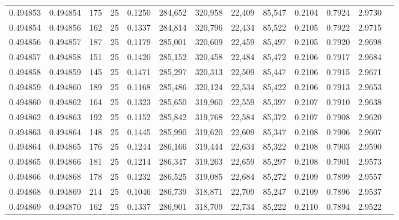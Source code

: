 \begin{tabular}{rrrrrrrrrrrrr}
0.494853 & 0.494854 &   175 &  25 &                                     0.1250 & 284,652 & 320,958 &  22,409 &  85,547 & 0.2104 & 0.7924 & 2.9730 \\
0.494854 & 0.494856 &   162 &  25 &                                     0.1337 & 284,814 & 320,796 &  22,434 &  85,522 & 0.2105 & 0.7922 & 2.9715 \\
0.494856 & 0.494857 &   187 &  25 &                                     0.1179 & 285,001 & 320,609 &  22,459 &  85,497 & 0.2105 & 0.7920 & 2.9698 \\
0.494857 & 0.494858 &   151 &  25 &                                     0.1420 & 285,152 & 320,458 &  22,484 &  85,472 & 0.2106 & 0.7917 & 2.9684 \\
0.494858 & 0.494859 &   145 &  25 &                                     0.1471 & 285,297 & 320,313 &  22,509 &  85,447 & 0.2106 & 0.7915 & 2.9671 \\
0.494859 & 0.494860 &   189 &  25 &                                     0.1168 & 285,486 & 320,124 &  22,534 &  85,422 & 0.2106 & 0.7913 & 2.9653 \\
0.494860 & 0.494862 &   164 &  25 &                                     0.1323 & 285,650 & 319,960 &  22,559 &  85,397 & 0.2107 & 0.7910 & 2.9638 \\
0.494862 & 0.494863 &   192 &  25 &                                     0.1152 & 285,842 & 319,768 &  22,584 &  85,372 & 0.2107 & 0.7908 & 2.9620 \\
0.494863 & 0.494864 &   148 &  25 &                                     0.1445 & 285,990 & 319,620 &  22,609 &  85,347 & 0.2108 & 0.7906 & 2.9607 \\
0.494864 & 0.494865 &   176 &  25 &                                     0.1244 & 286,166 & 319,444 &  22,634 &  85,322 & 0.2108 & 0.7903 & 2.9590 \\
0.494865 & 0.494866 &   181 &  25 &                                     0.1214 & 286,347 & 319,263 &  22,659 &  85,297 & 0.2108 & 0.7901 & 2.9573 \\
0.494866 & 0.494868 &   178 &  25 &                                     0.1232 & 286,525 & 319,085 &  22,684 &  85,272 & 0.2109 & 0.7899 & 2.9557 \\
0.494868 & 0.494869 &   214 &  25 &                                     0.1046 & 286,739 & 318,871 &  22,709 &  85,247 & 0.2109 & 0.7896 & 2.9537 \\
0.494869 & 0.494870 &   162 &  25 &                                     0.1337 & 286,901 & 318,709 &  22,734 &  85,222 & 0.2110 & 0.7894 & 2.9522 \\

\end{tabular}
